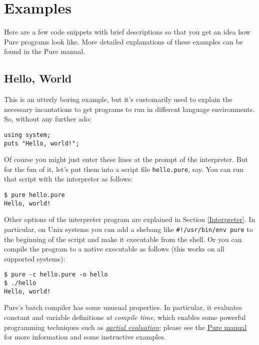 \documentclass[a4paper,12pt]{article}
\begin{document}
\section{Examples}
\label{Examples}

Here are a few code snippets with brief descriptions so that you get an idea
how Pure programs look like. More detailed explanations of these examples can
be found in the Pure manual.

\subsection{Hello, World}

This is an utterly boring example, but it's customarily used to explain the
necessary incantations to get programs to run in different language
environments. So, without any further ado:

\begin{lstlisting}
using system;
puts "Hello, world!";
\end{lstlisting}

Of course you might just enter these lines at the prompt of the interpreter. But for the fun of it, let's put them into a script file \texttt{hello.pure}, say. You can run that script with the interpreter as follows:

\begin{verbatim}
$ pure hello.pure
Hello, world!
\end{verbatim}

Other options of the interpreter program are explained in Section \ref{Interpreter}. In particular, on Unix systems you can add a shebang like \verb:#!/usr/bin/env pure: to the beginning of the script and make it executable from the shell. Or you can compile the program to a native executable as follows (this works on all supported systems):

\begin{verbatim}
$ pure -c hello.pure -o hello
$ ./hello
Hello, world!
\end{verbatim}

Pure's batch compiler has some unusual properties. In particular, it evaluates constant and variable definitions \emph{at compile time}, which enables some powerful programming techniques such as \href{http://en.wikipedia.org/wiki/Partial_evaluation}{\emph{partial evaluation}}; please see the \href{https://agraef.github.io/pure-docs/pure.html#batch-compilation}{Pure manual} for more information and some instructive examples.
\end{document}
